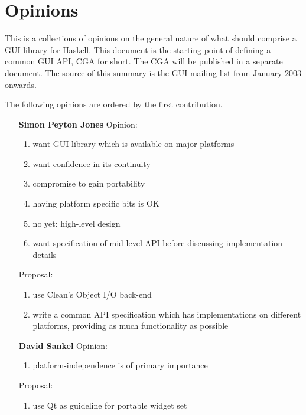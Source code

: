 \documentclass{article}
\newcommand{\Party}[1]{\stepcounter{enumi}\arabic{enumi} \bf #1}
\begin{document}
\section{Opinions}

This is a collections of opinions on the general nature of what should
comprise a GUI library for Haskell. This document is the starting
point of defining a common GUI API, CGA for short. The CGA will be
published in a separate document. The source of this summary is the
GUI mailing list from January 2003 onwards.

The following opinions are ordered by the first contribution.
\begin{enumerate}
\item[\Party{Simon Peyton Jones}] Opinion:

  \begin{enumerate}
  \item \label{allspj} want GUI library which is available on major platforms
  \item want confidence in its continuity
  \item \label{interspj} compromise to gain portability
  \item \label{hinderspj} having platform specific bits is OK
  \item \label{highspj} no yet: high-level design
  \item \label{scratchspj} want specification of mid-level API before
    discussing implementation details
  \end{enumerate}

  Proposal:
  \begin{enumerate}
  \item use Clean's Object I/O back-end
  \item write a common API specification which has implementations on
    different platforms, providing as much functionality as possible
  \end{enumerate}

\item[\Party{David Sankel}] Opinion:
  \begin{enumerate}
  \item \label{allds} platform-independence is of primary importance
  \end{enumerate}
  Proposal:
  \begin{enumerate}
  \item use Qt as guideline for portable widget set
  \end{enumerate}
  

\end{enumerate}
\end{document}
